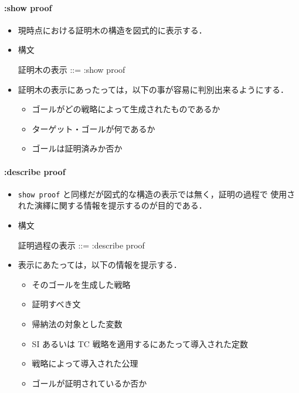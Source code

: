 \documentclass[a4paper,oneside,10pt,here]{memoir}
\newenvironment{vvtm}%
{\parskip=0pt\lineskip=0pt\begin{center}\begin{minipage}{0.8\textwidth}\begin{snugshade}}%
  {\end{snugshade}\end{minipage}\end{center}}
\begin{document}
\paragraph{:show proof}
\begin{itemize}
\item 現時点における証明木の構造を図式的に表示する．
\item 構文
  \begin{vvtm}
    \begin{simplev}
   証明木の表示 ::= :show proof
    \end{simplev}
  \end{vvtm}
\item 証明木の表示にあったっては，以下の事が容易に判別出来るようにする．
  \begin{itemize}
  \item ゴールがどの戦略によって生成されたものであるか
  \item ターゲット・ゴールが何であるか
  \item ゴールは証明済みか否か
  \end{itemize}
\end{itemize}

\paragraph{:describe proof}
\begin{itemize}
\item \verb|show proof| と同様だが図式的な構造の表示では無く，証明の過程で
  使用された演繹に関する情報を提示するのが目的である．
\item 構文
  \begin{vvtm}
    \begin{simplev}
   証明過程の表示 ::= :describe proof
    \end{simplev}
  \end{vvtm}
\item 表示にあたっては，以下の情報を提示する．
  \begin{itemize}
  \item そのゴールを生成した戦略
  \item 証明すべき文
  \item 帰納法の対象とした変数
  \item SI あるいは TC 戦略を適用するにあたって導入された定数
  \item 戦略によって導入された公理
  \item ゴールが証明されているか否か
  \end{itemize}
\end{itemize}
\end{document}
